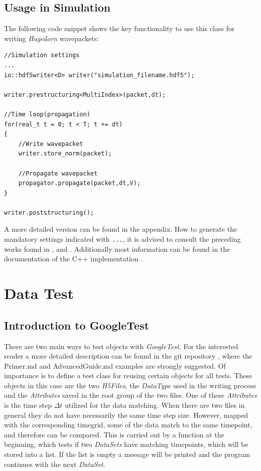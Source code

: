 \section{Usage in Simulation}
The following code snippet shows the key functionality to use this class for writing \textit{Hagedorn} wavepackets:

\begin{lstlisting}
//Simulation settings
...
io::hdf5writer<D> writer("simulation_filename.hdf5");

writer.prestructuring<MultiIndex>(packet,dt);

//Time loop(propagation)
for(real_t t = 0; t < T; t += dt)
{
	//Write wavepacket
	writer.store_norm(packet);
	
	//Propagate wavepacket
   	propagator.propagate(packet,dt,V);
}

writer.poststructuring();
\end{lstlisting}
A more detailed version can be found in the appendix. How to generate the mandatory settings indicated with \texttt{...}, it is advised to consult the preceding works found in \cite{bt_michajab}, \cite{st_benedekv} and \cite{bt_lionelm}. Additionally most information can be found in the documentation of the C++ implementation \cite{libwaveblocks}.

\chapter{Data Test}

\section{Introduction to GoogleTest}
There are two main ways to test objects with \textit{GoogleTest}. For the interested reader a more detailed description can be found in the git repository \cite{googletestdoc}, where the Primer.md and AdvancedGuide.md examples are strongly suggested. Of importance is to define a test class for reusing certain objects for all tests. These objects in this case are the two \textit{H5Files}, the \textit{DataType} used in the writing process and the \textit{Attributes} saved in the root group of the two files. One of these \textit{Attributes} is the time step $\Delta t$ utilized for the data matching. When there are two files in general they do not have necessarily the same time step size. However, mapped with the corresponding timegrid, some of the data match to the same timepoint, and therefore can be compared. This is carried out by a function at the beginning, which tests if two \textit{DataSets} have matching timepoints, which will be stored into a list. If the list is empty a message will be printed and the program continues with the next \textit{DataSet}.

